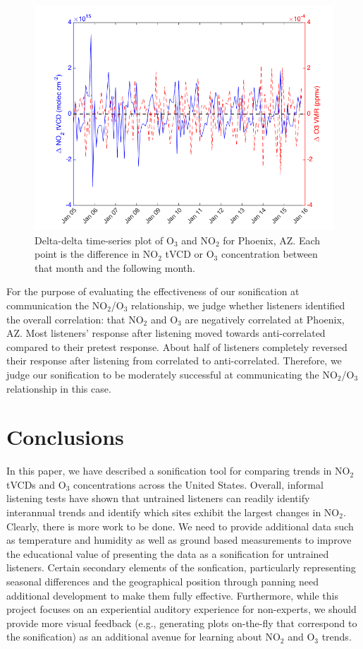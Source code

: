 \documentclass[a4paper,10pt,oneside]{article}
\newcommand{\ce}[1]{$\mathrm{#1}$}
\begin{document}
\begin{sloppy}
	\begin{figure}
	\centering
	\includegraphics[width=0.95\columnwidth]{figs/delta-delta-timeser-phoenix_AZ.png} 
	\caption{Delta-delta time-series plot of \ce{O_3} and \ce{NO_2} for Phoenix, AZ. Each point is the difference in \ce{NO_2} tVCD or \ce{O_3} concentration between that month and the following month.}
	\label{fig:del-del}
	\end{figure}
	
	For the purpose of evaluating the effectiveness of our sonification at communication the \ce{NO_2}/\ce{O_3} relationship, we judge whether listeners identified the overall correlation: that \ce{NO_2} and \ce{O_3} are negatively correlated at Phoenix, AZ. Most listeners' response after listening moved towards anti-correlated compared to their pretest response. About half of listeners completely reversed their response after listening from correlated to anti-correlated. Therefore, we judge our sonification to be moderately successful at communicating the \ce{NO_2}/\ce{O_3} relationship in this case.

\section{Conclusions}
In this paper, we have described a sonification tool for comparing trends in \ce{NO_2} tVCDs and \ce{O_3} concentrations across the United States.  Overall, informal listening tests have shown that untrained listeners can readily identify interannual trends and identify which sites exhibit the largest changes in \ce{NO_2}.  Clearly, there is more work to be done. We need to provide additional data such as temperature and humidity as well as ground based measurements to improve the educational value of presenting the data as a sonification for untrained listeners.  Certain secondary elements of the sonfication, particularly representing seasonal differences and the geographical position through panning need additional development to make them fully effective.  Furthermore, while this project focuses on an experiential auditory experience for non-experts, we should provide more visual feedback (e.g., generating plots on-the-fly that correspond to the sonification) as an additional avenue for learning about \ce{NO_2} and \ce{O_3} trends.  



\end{sloppy}
\end{document}
